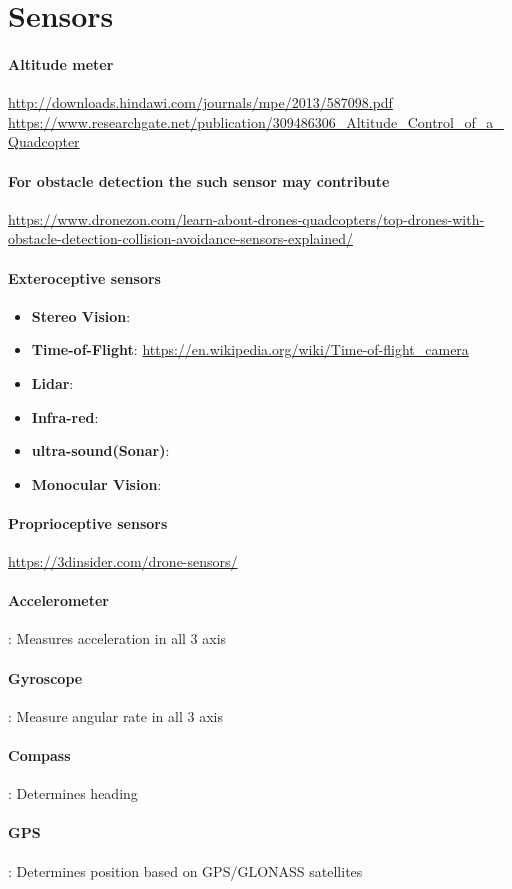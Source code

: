\documentclass{article}
\begin{document}
	\section{Sensors}
		\paragraph{Altitude meter}
		\url{http://downloads.hindawi.com/journals/mpe/2013/587098.pdf}
		\url{https://www.researchgate.net/publication/309486306_Altitude_Control_of_a_Quadcopter}
		\paragraph{For obstacle detection the such sensor may contribute}
		\url{https://www.dronezon.com/learn-about-drones-quadcopters/top-drones-with-obstacle-detection-collision-avoidance-sensors-explained/}
		\paragraph{Exteroceptive sensors}
			\begin{itemize}
				\item \textbf{Stereo Vision}:
				\item \textbf{Time-of-Flight}: \url{https://en.wikipedia.org/wiki/Time-of-flight_camera}
				\item \textbf{Lidar}:
				\item \textbf{Infra-red}:
				\item \textbf{ultra-sound(Sonar)}:
				\item \textbf{Monocular Vision}:
			\end{itemize}
		\paragraph{Proprioceptive sensors}
			\url{https://3dinsider.com/drone-sensors/}
			\paragraph{Accelerometer}: Measures acceleration in all 3 axis
			\paragraph{Gyroscope}: Measure angular rate in all 3 axis
			\paragraph{Compass}: Determines heading
			\paragraph{GPS}: Determines position based on GPS/GLONASS satellites
\end{document}
